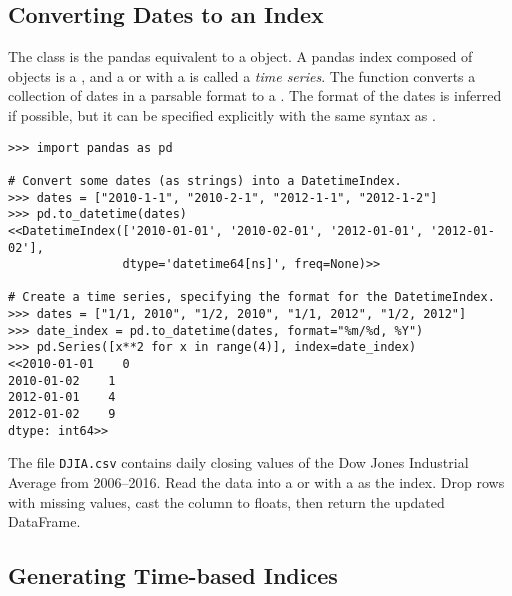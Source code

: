 \subsection*{Converting Dates to an Index} %

The  class is the pandas equivalent to a  object.
A pandas index composed of  objects is a , and a  or  with a  is called a \emph{time series}.
The function  converts a collection of dates in a parsable format to a .
The format of the dates is inferred if possible, but it can be specified explicitly with the same syntax as .

\begin{lstlisting}
>>> import pandas as pd

# Convert some dates (as strings) into a DatetimeIndex.
>>> dates = ["2010-1-1", "2010-2-1", "2012-1-1", "2012-1-2"]
>>> pd.to_datetime(dates)
<<DatetimeIndex(['2010-01-01', '2010-02-01', '2012-01-01', '2012-01-02'],
                dtype='datetime64[ns]', freq=None)>>

# Create a time series, specifying the format for the DatetimeIndex.
>>> dates = ["1/1, 2010", "1/2, 2010", "1/1, 2012", "1/2, 2012"]
>>> date_index = pd.to_datetime(dates, format="%m/%d, %Y")
>>> pd.Series([x**2 for x in range(4)], index=date_index)
<<2010-01-01    0
2010-01-02    1
2012-01-01    4
2012-01-02    9
dtype: int64>>
\end{lstlisting}

\begin{problem} %
The file \texttt{DJIA.csv} contains daily closing values of the Dow Jones Industrial Average from 2006--2016.
Read the data into a  or  with a  as the index.
Drop rows with missing values, cast the  column to floats, then return the updated DataFrame.
\label{prob:timeseries-dowjones}
\end{problem}

\subsection*{Generating Time-based Indices} %

